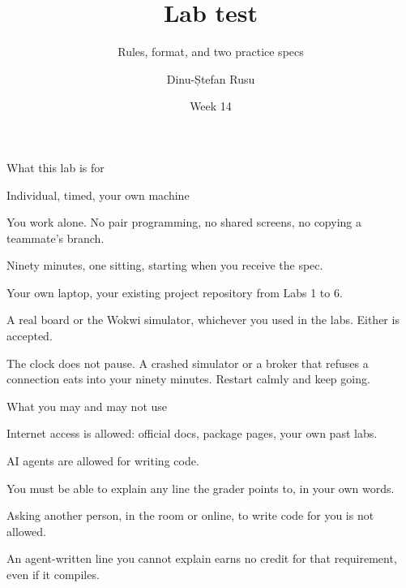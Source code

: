 \documentclass[10pt,aspectratio=169,t]{beamer}
\title{Lab test}
\subtitle{Rules, format, and two practice specs}
\author{Dinu-Ștefan Rusu}
\institute{FILS, Universitatea Politehnica București}
\date{Week 14}
\begin{document}
\titleframe

\begin{frame}[eyebrow=Today]{What this lab is for}
  \vskip 2mm
  \begin{grid}[2]
  \end{grid}
  \vskip 6mm
\end{frame}

\begin{frame}[eyebrow=Rules]{Individual, timed, your own machine}
  \begin{steps}
    \item You work alone. No pair programming, no shared screens, no copying a teammate's branch.
    \item Ninety minutes, one sitting, starting when you receive the spec.
    \item Your own laptop, your existing project repository from Labs 1 to 6.
    \item A real board or the Wokwi simulator, whichever you used in the labs. Either is accepted.
  \end{steps}
  \begin{takeaway}{The clock does not pause.}
    A crashed simulator or a broker that refuses a connection eats into your ninety minutes. Restart calmly and keep going.
  \end{takeaway}
\end{frame}

\begin{frame}[eyebrow=Rules]{What you may and may not use}
  \begin{steps}
    \item Internet access is allowed: official docs, package pages, your own past labs.
    \item AI agents are allowed for writing code.
    \item You must be able to explain any line the grader points to, in your own words.
    \item Asking another person, in the room or online, to write code for you is not allowed.
  \end{steps}
  \begin{warning}
    An agent-written line you cannot explain earns no credit for that requirement, even if it compiles.
  \end{warning}
\end{frame}
\end{document}
